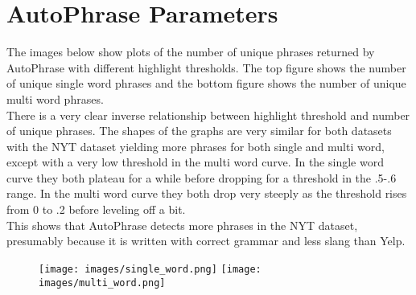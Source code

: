 \documentclass{article}
\begin{document}
\section*{AutoPhrase Parameters}
The images below show plots of the number of unique phrases returned by AutoPhrase with different highlight thresholds.  The top figure shows the number of unique single word phrases and the bottom figure shows the number of unique multi word phrases.\\
There is a very clear inverse relationship between highlight threshold and number of unique phrases.  The shapes of the graphs are very similar for both datasets with the NYT dataset yielding more phrases for both single and multi word, except with a very low threshold in the multi word curve.  In the single word curve they both plateau for a while before dropping for a threshold in the .5-.6 range.  In the multi word curve they both drop very steeply as the threshold rises from 0 to .2 before leveling off a bit.\\
This shows that AutoPhrase detects more phrases in the NYT dataset, presumably because it is written with correct grammar and less slang than Yelp.
\begin{figure}[ht]
\centering
\texttt{[image: images/single\_word.png]}
\texttt{[image: images/multi\_word.png]}
\end{figure}
\end{document}
